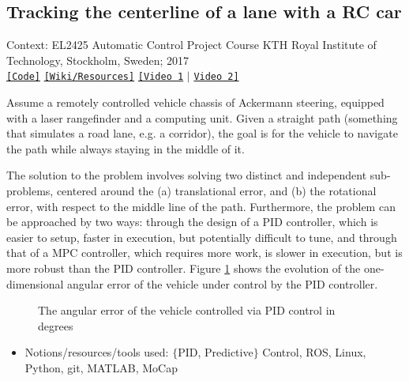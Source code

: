 \subsection{Tracking the centerline of a lane with a RC car}

\noindent Context: EL2425 Automatic Control Project Course
\noindent KTH Royal Institute of Technology, Stockholm, Sweden; 2017\\

\noindent \href{https://github.com/li9i/HT16_P2_EL2425}{\texttt{[Code]}} \href{https://github.com/li9i/HT16_P2_EL2425_resources}{\texttt{[Wiki/Resources]}} \href{https://www.youtube.com/watch?v=w3Wnw5SLmss}{\texttt{[Video 1}} $|$ \href{https://youtu.be/937OZez1iN8?t=142}{\texttt{Video 2]}} \\

\begin{problem}
Assume a remotely controlled vehicle chassis of Ackermann
steering, equipped with a laser rangefinder and a computing unit. Given a
straight path (something that simulates a road lane, e.g. a corridor), the goal
is for the vehicle to navigate the path while always staying in the middle of it.
\end{problem}

The solution to the problem involves solving two distinct and independent
sub-problems, centered around the (a) translational error, and (b) the
rotational error, with respect to the middle line of the path. Furthermore, the
problem can be approached by two ways: through the design of a PID controller,
which is easier to setup, faster in execution, but potentially difficult to
tune, and through that of a MPC controller, which requires more work, is slower
in execution, but is more robust than the PID controller. Figure
\ref{fig:centerline_pid_error} shows the evolution of the one-dimensional
angular error of the vehicle under control by the PID controller.

\begin{figure}[H]\centering
  \scalebox{0.6}{}
  \caption{\small The angular error of the vehicle controlled via PID control
           in degrees}
  \label{fig:centerline_pid_error}
\end{figure}

\begin{itemize}
  \item Notions/resources/tools used: $\{$PID, Predictive$\}$ Control, ROS,  Linux, Python, git, MATLAB, MoCap
\end{itemize}
